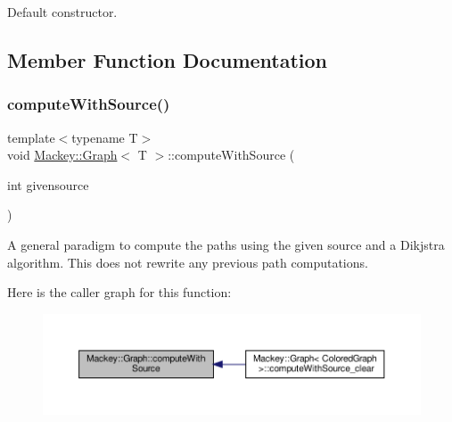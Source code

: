 Default constructor. 



\subsection{Member Function Documentation}
\mbox{\label{classMackey_1_1Graph_acda32cd8d144dcd1ec771bd8d2753321}} 
\subsubsection{\texorpdfstring{compute\+With\+Source()}{computeWithSource()}}
{\footnotesize\ttfamily template$<$typename T$>$ \\
void \hyperlink{classMackey_1_1Graph}{Mackey\+::\+Graph}$<$ T $>$\+::compute\+With\+Source (\begin{DoxyParamCaption}\item[{int}]{givensource }\end{DoxyParamCaption})\hspace{0.3cm}{\ttfamily [inline]}}



A general paradigm to compute the paths using the given source and a Dikjstra algorithm. This does not rewrite any previous path computations. 

Here is the caller graph for this function\+:\nopagebreak
\begin{figure}[H]
\begin{center}
\leavevmode
\includegraphics[width=350pt]{classMackey_1_1Graph_acda32cd8d144dcd1ec771bd8d2753321_icgraph}
\end{center}
\end{figure}
\mbox{\label{classMackey_1_1Graph_a769966fd9422efb15a53db185a8be278}} 
